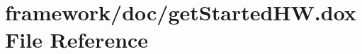 \hypertarget{get_started_h_w_8dox}{}\section{framework/doc/get\+Started\+HW.dox File Reference}
\label{get_started_h_w_8dox}
